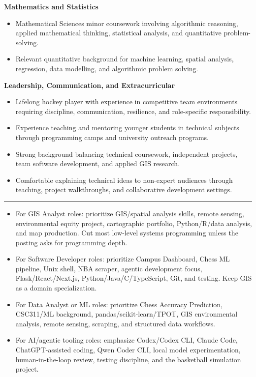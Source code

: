 \documentclass[10.5pt,letterpaper]{article}
\newcommand{\ressection}[1]{\vspace{6pt}{\Large\bfseries\color{sectionblue}#1}\par\vspace{-2pt}\hrule\vspace{4pt}}
\begin{document}
\textbf{Mathematics and Statistics}\par
\begin{itemize}
\item Mathematical Sciences minor coursework involving algorithmic reasoning, applied mathematical thinking, statistical analysis, and quantitative problem-solving.
\item Relevant quantitative background for machine learning, spatial analysis, regression, data modelling, and algorithmic problem solving.
\end{itemize}
\textbf{Leadership, Communication, and Extracurricular}\par
\begin{itemize}
\item Lifelong hockey player with experience in competitive team environments requiring discipline, communication, resilience, and role-specific responsibility.
\item Experience teaching and mentoring younger students in technical subjects through programming camps and university outreach programs.
\item Strong background balancing technical coursework, independent projects, team software development, and applied GIS research.
\item Comfortable explaining technical ideas to non-expert audiences through teaching, project walkthroughs, and collaborative development settings.
\end{itemize}
\ressection{Tailoring Notes - Remove Before Applying}
\begin{itemize}
\item For GIS Analyst roles: prioritize GIS/spatial analysis skills, remote sensing, environmental equity project, cartographic portfolio, Python/R/data analysis, and map production. Cut most low-level systems programming unless the posting asks for programming depth.
\item For Software Developer roles: prioritize Campus Dashboard, Chess ML pipeline, Unix shell, NBA scraper, agentic development focus, Flask/React/Next.js, Python/Java/C/TypeScript, Git, and testing. Keep GIS as a domain specialization.
\item For Data Analyst or ML roles: prioritize Chess Accuracy Prediction, CSC311/ML background, pandas/scikit-learn/TPOT, GIS environmental analysis, remote sensing, scraping, and structured data workflows.
\item For AI/agentic tooling roles: emphasize Codex/Codex CLI, Claude Code, ChatGPT-assisted coding, Qwen Coder CLI, local model experimentation, human-in-the-loop review, testing discipline, and the basketball simulation project.
\end{itemize}
\end{document}
